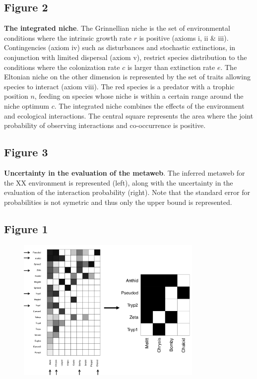 \documentclass[12pt]{article}
\begin{document}
\subsection*{Figure 2}
\textbf{The integrated niche}. The Grinnellian niche is the set of environmental conditions
where the intrinsic growth rate $r$ is positive (axioms i, ii \& iii).
Contingencies (axiom iv) such as disturbances and stochastic extinctions, in
conjunction with limited dispersal (axiom v), restrict species distribution to
the conditions where the colonization rate $c$ is larger than extinction rate
$e$. The Eltonian niche on the other dimension is represented by the set of
traits allowing species to interact (axiom viii). The red species is a predator
with a trophic position $n$, feeding on species whose niche is within a certain
range around the niche optimum $c$. The integrated niche combines the effects of
the environment and ecological interactions. The central square represents the
area where the joint probability of observing interactions and co-occurrence is
positive.

\subsection*{Figure 3}
\textbf{Uncertainty in the evaluation of the metaweb}. The inferred metaweb for the XX environment is represented (left), along with the uncertainty in the evaluation of the interaction probability (right). Note that the standard error for probabilities is not symetric and thus only the upper bound is represented. 

\newpage
\subsection*{Figure 1}

\begin{figure}[ht!]
\centering\includegraphics[width=0.8\textwidth]{sampling}
\end{figure}
\end{document}
